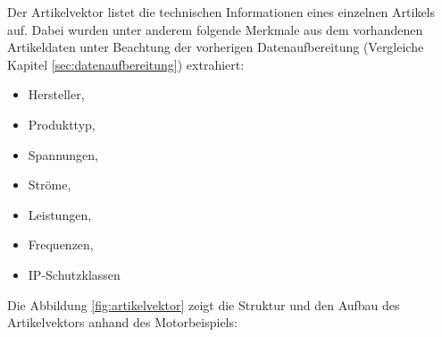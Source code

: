 Der Artikelvektor listet die technischen Informationen eines einzelnen Artikels auf. 
Dabei wurden unter anderem folgende Merkmale aus dem vorhandenen Artikeldaten unter Beachtung der vorherigen Datenaufbereitung (Vergleiche Kapitel \ref{sec:datenaufbereitung}) extrahiert: 
 
\begin{itemize} 
    \item Hersteller, 
    \item Produkttyp, 
    \item Spannungen, 
    \item Ströme, 
    \item Leistungen, 
    \item Frequenzen, 
    \item IP-Schutzklassen 
\end{itemize} 

Die Abbildung \ref{fig:artikelvektor} zeigt die Struktur und den Aufbau des Artikelvektors anhand des Motorbeispiels:

